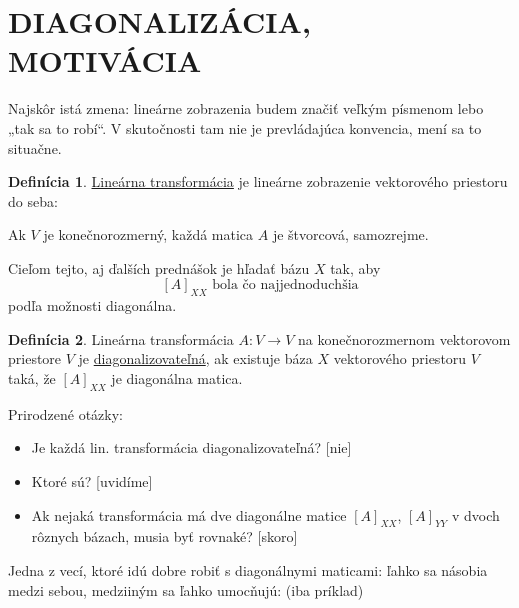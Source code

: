 \documentclass[11pt,a4paper]{article}
\theoremstyle{definition}
\newtheorem{definicia}{Definícia}[section]
\theoremstyle{plain}
\theoremstyle{remark}
\begin{document}
\section*{DIAGONALIZÁCIA, MOTIVÁCIA}

Najskôr istá zmena: lineárne zobrazenia budem značiť veľkým písmenom lebo „tak sa to robí“. V skutočnosti tam nie je prevládajúca konvencia, mení sa to situačne.

\setcounter{section}{3} %
\setcounter{definicia}{0}

\begin{definicia}
\ul{Lineárna transformácia} je lineárne zobrazenie vektorového priestoru do seba:
\end{definicia}

\vspace{0.3cm}
\begin{center}
\end{center}
\vspace{0.3cm}

Ak $V$ je konečnorozmerný, každá matica $A$ je štvorcová, samozrejme.

Cieľom tejto, aj ďalších prednášok je hľadať bázu $X$ tak, aby
\[ [A]_{XX} \text{ bola čo najjednoduchšia} \]
podľa možnosti diagonálna.

\begin{definicia}
Lineárna transformácia $A \colon V \to V$ na konečnorozmernom vektorovom priestore $V$ je \ul{diagonalizovateľná}, ak existuje báza $X$ vektorového priestoru $V$ taká, že $[A]_{XX}$ je diagonálna matica.
\end{definicia}

Prirodzené otázky:
\begin{itemize}
    \item Je každá lin. transformácia diagonalizovateľná? [nie]
    \item Ktoré sú? [uvidíme]
    \item Ak nejaká transformácia má dve diagonálne matice $[A]_{XX}$, $[A]_{YY}$ v dvoch rôznych bázach, musia byť rovnaké? [skoro]
\end{itemize}

Jedna z vecí, ktoré idú dobre robiť s diagonálnymi maticami: ľahko sa násobia medzi sebou, medziiným sa ľahko umocňujú: (iba príklad)
\end{document}
